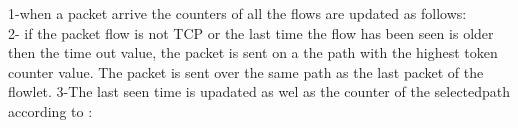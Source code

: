 1-when a packet arrive the counters of all the flows are updated as follows:
\begin{equation}
\end{equation}
2- if the packet flow is not TCP or the last time the flow has been seen is older then the time out value, the packet is sent on a the path with the highest token counter value. The packet is sent over the same path as the last packet of the flowlet.
3-The last seen time is upadated as wel as the counter of the selectedpath according to :
\begin{equation}
\end{equation}



